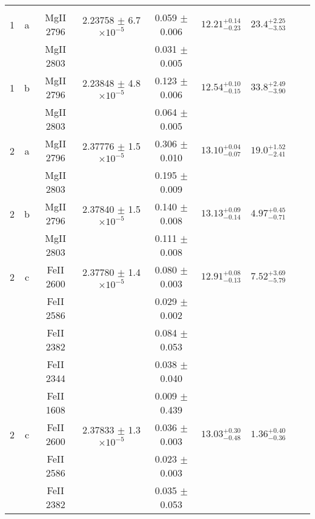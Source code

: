 \documentclass[12pt]{article}
\begin{document}
\begin{footnotesize}
\begin{longtable}{ c c c c c c c c c}
\hline                                                                                                                                                   
		&	   &                           &            & 	& 					&							  	& \\                                                                 
       1  & a  & MgII     2796  &  2.23758 $\pm$ 6.7 $\times 10^{-5}$   &  0.059 $\pm$ 0.006   & $12.21_{ - 0.23}^{ + 0.14}$  & $23.4_{ - 3.53}^{ + 2.25}$    & 	 & \\ 
  &   & MgII     2803  &  &  0.031 $\pm$ 0.005   &   &     & 	 & \\ 
       1  & b  & MgII     2796  &  2.23848 $\pm$ 4.8 $\times 10^{-5}$   &  0.123 $\pm$ 0.006   & $12.54_{ - 0.15}^{ + 0.10}$  & $33.8_{ - 3.90}^{ + 2.49}$    & 	 & \\ 
  &   & MgII     2803  &  &  0.064 $\pm$ 0.005   &   &     & 	 & \\ 
       2  & a  & MgII     2796  &  2.37776 $\pm$ 1.5 $\times 10^{-5}$   &  0.306 $\pm$ 0.010   & $13.10_{ - 0.07}^{ + 0.04}$  & $19.0_{ - 2.41}^{ + 1.52}$    & 	 & \\ 
  &   & MgII     2803  &  &  0.195 $\pm$ 0.009   &   &     & 	 & \\ 
       2  & b  & MgII     2796  &  2.37840 $\pm$ 1.5 $\times 10^{-5}$   &  0.140 $\pm$ 0.008   & $13.13_{ - 0.14}^{ + 0.09}$  & $4.97_{ - 0.71}^{ + 0.45}$    & 	 & \\ 
  &   & MgII     2803  &  &  0.111 $\pm$ 0.008   &   &     & 	 & \\ 
       2  & c  & FeII     2600  &  2.37780 $\pm$ 1.4 $\times 10^{-5}$   &  0.080 $\pm$ 0.003   & $12.91_{ - 0.13}^{ + 0.08}$  & $7.52_{ - 5.79}^{ + 3.69}$    & 	 & \\ 
  &   & FeII     2586  &  &  0.029 $\pm$ 0.002   &   &     & 	 & \\ 
  &   & FeII     2382  &  &  0.084 $\pm$ 0.053   &   &     & 	 & \\ 
  &   & FeII     2344  &  &  0.038 $\pm$ 0.040   &   &     & 	 & \\ 
  &   & FeII     1608  &  &  0.009 $\pm$ 0.439   &   &     & 	 & \\ 
       2  & c  & FeII     2600  &  2.37833 $\pm$ 1.3 $\times 10^{-5}$   &  0.036 $\pm$ 0.003   & $13.03_{ - 0.48}^{ + 0.30}$  & $1.36_{ - 0.36}^{ + 0.40}$    & 	 & \\ 
  &   & FeII     2586  &  &  0.023 $\pm$ 0.003   &   &     & 	 & \\ 
  &   & FeII     2382  &  &  0.035 $\pm$ 0.053   &   &     & 	 & \\ 

\end{longtable}
\end{footnotesize}
\end{document}
